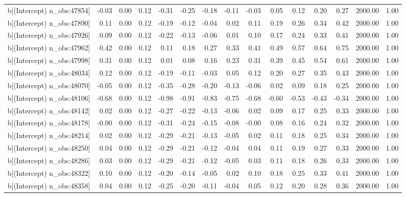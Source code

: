 \begin{table}[ht]
\begin{tabular}{rrrrrrrrrrrrrrr}
  b[(Intercept) n\_obs:47854] & -0.03 & 0.00 & 0.12 & -0.31 & -0.25 & -0.18 & -0.11 & -0.03 & 0.05 & 0.12 & 0.20 & 0.27 & 2000.00 & 1.00 \\ 
  b[(Intercept) n\_obs:47890] & 0.11 & 0.00 & 0.12 & -0.19 & -0.12 & -0.04 & 0.02 & 0.11 & 0.19 & 0.26 & 0.34 & 0.42 & 2000.00 & 1.00 \\ 
  b[(Intercept) n\_obs:47926] & 0.09 & 0.00 & 0.12 & -0.22 & -0.13 & -0.06 & 0.01 & 0.10 & 0.17 & 0.24 & 0.33 & 0.41 & 2000.00 & 1.00 \\ 
  b[(Intercept) n\_obs:47962] & 0.42 & 0.00 & 0.12 & 0.11 & 0.18 & 0.27 & 0.33 & 0.41 & 0.49 & 0.57 & 0.64 & 0.75 & 2000.00 & 1.00 \\ 
  b[(Intercept) n\_obs:47998] & 0.31 & 0.00 & 0.12 & 0.01 & 0.08 & 0.16 & 0.23 & 0.31 & 0.39 & 0.45 & 0.54 & 0.61 & 2000.00 & 1.00 \\ 
  b[(Intercept) n\_obs:48034] & 0.12 & 0.00 & 0.12 & -0.19 & -0.11 & -0.03 & 0.05 & 0.12 & 0.20 & 0.27 & 0.35 & 0.43 & 2000.00 & 1.00 \\ 
  b[(Intercept) n\_obs:48070] & -0.05 & 0.00 & 0.12 & -0.35 & -0.28 & -0.20 & -0.13 & -0.06 & 0.02 & 0.09 & 0.18 & 0.25 & 2000.00 & 1.00 \\ 
  b[(Intercept) n\_obs:48106] & -0.68 & 0.00 & 0.12 & -0.98 & -0.91 & -0.83 & -0.75 & -0.68 & -0.60 & -0.53 & -0.43 & -0.34 & 2000.00 & 1.00 \\ 
  b[(Intercept) n\_obs:48142] & 0.02 & 0.00 & 0.12 & -0.27 & -0.22 & -0.13 & -0.06 & 0.02 & 0.09 & 0.17 & 0.25 & 0.33 & 2000.00 & 1.00 \\ 
  b[(Intercept) n\_obs:48178] & -0.00 & 0.00 & 0.12 & -0.31 & -0.24 & -0.15 & -0.08 & -0.00 & 0.08 & 0.16 & 0.24 & 0.32 & 2000.00 & 1.00 \\ 
  b[(Intercept) n\_obs:48214] & 0.02 & 0.00 & 0.12 & -0.29 & -0.21 & -0.13 & -0.05 & 0.02 & 0.11 & 0.18 & 0.25 & 0.34 & 2000.00 & 1.00 \\ 
  b[(Intercept) n\_obs:48250] & 0.04 & 0.00 & 0.12 & -0.29 & -0.21 & -0.12 & -0.04 & 0.04 & 0.11 & 0.19 & 0.27 & 0.33 & 2000.00 & 1.00 \\ 
  b[(Intercept) n\_obs:48286] & 0.03 & 0.00 & 0.12 & -0.29 & -0.21 & -0.12 & -0.05 & 0.03 & 0.11 & 0.18 & 0.26 & 0.33 & 2000.00 & 1.00 \\ 
  b[(Intercept) n\_obs:48322] & 0.10 & 0.00 & 0.12 & -0.20 & -0.14 & -0.05 & 0.02 & 0.10 & 0.18 & 0.25 & 0.33 & 0.41 & 2000.00 & 1.00 \\ 
  b[(Intercept) n\_obs:48358] & 0.04 & 0.00 & 0.12 & -0.25 & -0.20 & -0.11 & -0.04 & 0.05 & 0.12 & 0.20 & 0.28 & 0.36 & 2000.00 & 1.00 \\ 

\end{tabular}
\end{table}
